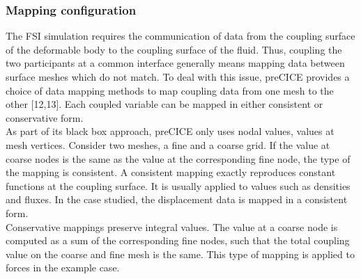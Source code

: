 \documentclass[oneside,11pt,times]{book}
\begin{document}
\subsubsection{Mapping configuration}
The FSI simulation requires the communication of data from the coupling surface of the deformable body to the coupling surface of the fluid. Thus, coupling the two participants at a common interface generally means mapping data between surface meshes which do not match. To deal with this issue, preCICE provides a choice of data mapping methods to map coupling data from one mesh to the other [12,13]. Each coupled variable can be mapped in either consistent or conservative form.\\

As part of its black box approach, preCICE only uses nodal values, values at mesh vertices. Consider two meshes, a fine and a coarse grid. If the value at coarse nodes is the same as the value at the corresponding fine node, the type of the mapping is consistent. A consistent mapping exactly reproduces constant functions at the coupling surface. It is usually applied to values such as densities and fluxes. In the case studied, the displacement data is mapped in a consistent form.\\

Conservative mappings preserve integral values. The value at a coarse node is computed as a sum of the corresponding fine nodes, such that the total coupling value on the coarse and fine mesh is the same. This type of mapping is applied to forces in the example case.\\
\end{document}
